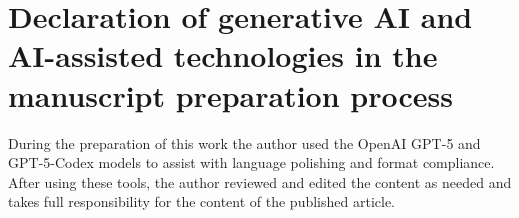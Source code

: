 \documentclass[review]{elsarticle}
\begin{document}
\section*{Declaration of generative AI and AI-assisted technologies in the manuscript preparation process}
During the preparation of this work the author used the OpenAI GPT-5 and GPT-5-Codex models to assist with language polishing and format compliance. After using these tools, the author reviewed and edited the content as needed and takes full responsibility for the content of the published article.



\end{document}
